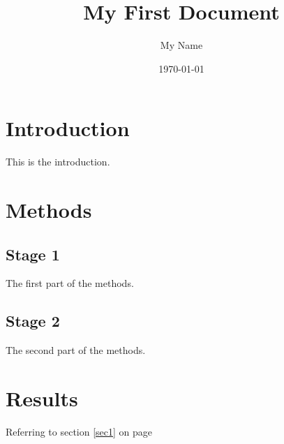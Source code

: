 \documentclass[a4paper,12pt]{article} %
\begin{document}
 



\title{My First Document} 

\author{My Name} 

\date{\today} 

\maketitle





\tableofcontents 

\newpage




\section{Introduction} 

This is the introduction. 


\section{Methods}


\subsection{Stage 1} 

The first part of the methods.


\subsection{Stage 2}

The second part of the methods. 


\section{Results}

Referring to section \ref{sec1} on page \pageref{sec1}
\end{document}
